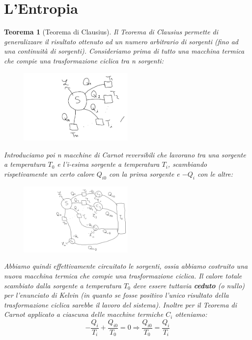 \documentclass{article}
\newtheorem{thm}{Teorema}[section]
\newcommand{\then}{\ensuremath{\Rightarrow}}
\begin{document}
\section{L'Entropia}
\begin{thm}[Teorema di Clausius]
Il Teorema di Clausius permette di generalizzare il risultato ottenuto ad un numero arbitrario di sorgenti (fino ad una continuità di sorgenti). Consideriamo prima di tutto una macchina termica che compie una trasformazione ciclica tra n sorgenti:
\begin{figure}[H]
    \centering
    \includegraphics[width=0.5\textwidth]{TeoremaClausius1.png}
    \label{TeoremaClausius1}
\end{figure}
Introduciamo poi n macchine di Carnot reversibili che lavorano tra una sorgente a temperatura $T_0$ e l'i-esima sorgente a temperatura $T_i$, scambiando rispetivamente un certo calore $Q_{i0}$ con la prima sorgente e $-Q_i$ con le altre:
\begin{figure}[H]
    \centering
    \includegraphics[width=0.5\textwidth]{TeoremaClausius2.png}
    \label{TeoremaClausius2}
\end{figure}
Abbiamo quindi effettivamente circuitato le sorgenti, ossia abbiamo costruito una nuova macchina termica che compie una trasformazione ciclica. Il calore totale scambiato dalla sorgente a temperatura $T_0$ deve essere tuttavia \textbf{ceduto} (o nullo) per l'enunciato di Kelvin (in quanto se fosse positivo l'unico risultato della trasformazione ciclica sarebbe il lavoro del sistema). Inoltre per il Teorema di Carnot applicato a ciascuna delle macchine termiche $C_i$ otteniamo:
\[-\frac{Q_i}{T_i}+\frac{Q_{i0}}{T_0}=0\then \frac{Q_{i0}}{T_0}=\frac{Q_i}{T_i}\]

\end{thm}
\end{document}

